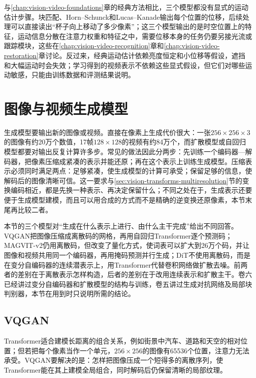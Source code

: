 与\ref{chap:vision-video-foundations}章的经典方法相比，三个模型都没有显式的运动估计步骤。块匹配、Horn--Schunck和Lucas--Kanade输出每个位置的位移，后续处理可以直接读出“杯子向上移动了多少像素”；这三个模型输出的是时空位置上的特征，运动信息分散在注意力权重和特征之中，需要位移本身的任务仍要另接光流或跟踪模块，这些在\ref{chap:vision-video-recognition}章和\ref{chap:vision-video-restoration}章讨论。反过来，经典运动估计依赖亮度恒定和小位移等假设，遮挡和大幅运动时会失效；学习得到的视频表示不依赖这些显式假设，但它们对哪些运动敏感，只能由训练数据和评测结果说明。

\section{图像与视频生成模型}
\label{sec:vision-ivm-generation}

生成模型要输出新的图像或视频。直接在像素上生成代价很大：一张$256\times256\times3$的图像有约20万个数值，17帧$128\times128$的视频有约84万个，而扩散模型或自回归模型都要对输出反复计算许多步。常见的做法因此分两步：先训练一个编码器—解码器，把像素压缩成紧凑的表示并能还原；再在这个表示上训练生成模型。压缩表示必须同时满足两点：足够紧凑，使生成模型的计算可承受；保留足够的信息，使解码后的图像清晰可信。这一要求与\ref{sec:vision-transforms-multiresolution}节的变换编码相近，都是先换一种表示、再决定保留什么；不同之处在于，生成表示还要便于生成模型建模，而且可以用合成的方式而不是精确的逆变换还原像素，本节末尾再比较二者。

本节的三个模型对“生成在什么表示上进行、由什么主干完成”给出不同回答。VQGAN把图像压缩成离散码的网格，再用自回归Transformer逐个预测码；MAGVIT-v2仍用离散码，但改变了量化方式，使词表可以扩大到26万个码，并让图像和视频共用同一个编码器，再用掩码预测并行生成；DiT不使用离散码，而是在变分自编码器的连续潜表示上，用Transformer代替卷积网络做扩散去噪。前两者的差别在于离散表示怎样构造，后者的差别在于改用连续表示和扩散主干。卷六已经讲过变分自编码器和扩散模型的结构与训练，卷五讲过生成对抗网络及局部块判别器，本节在用到时只说明所需的结论。

\subsection{VQGAN}
\label{sec:vision-ivm-vqgan}

Transformer适合建模长距离的组合关系，例如街景中汽车、道路和天空的相对位置；但若把每个像素当作一个单元，$256\times256$的图像有65536个位置，注意力无法承受。VQGAN要解决的是：怎样把图像压成一个短得多的离散序列，使Transformer能在其上建模全局组合，同时解码后仍保留清晰的局部纹理。

